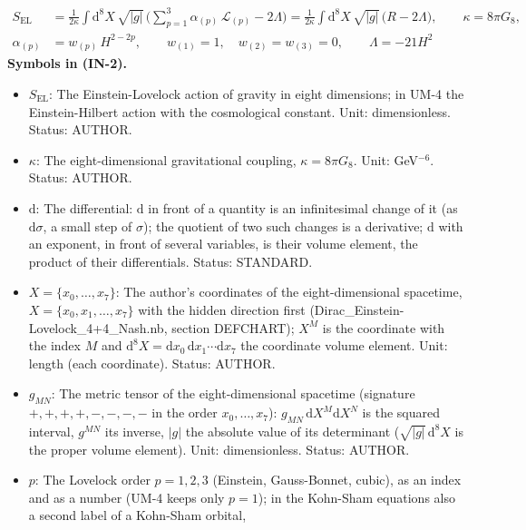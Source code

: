 \documentclass[
  10pt,
]{article}
\providecommand{\tightlist}{%
  \setlength{\itemsep}{0pt}\setlength{\parskip}{0pt}}
\begin{document}
\[
\begin{aligned}
S_{\mathrm{EL}} &= \frac{1}{2\kappa}\int\mathrm{d}^8X\,\sqrt{\lvert g\rvert}\,\Big(\sum_{p=1}^{3}\alpha_{(p)}\,\mathcal{L}_{(p)}
 - 2\Lambda\Big) = \frac{1}{2\kappa}\int\mathrm{d}^8X\,\sqrt{\lvert g\rvert}\,\big(R - 2\Lambda\big),\qquad \kappa = 8\pi G_8,\\
\alpha_{(p)} &= w_{(p)}\,H^{2-2p},\qquad w_{(1)} = 1,\quad w_{(2)} = w_{(3)} = 0,\qquad \Lambda = -21H^2
\end{aligned} \tag{IN-2}
\] \textbf{Symbols in (IN-2).}

\begin{itemize}
\tightlist
\item
  \(S_{\mathrm{EL}}\): The Einstein-Lovelock action of gravity in eight
  dimensions; in UM-4 the Einstein-Hilbert action with the cosmological
  constant. Unit: dimensionless. Status: AUTHOR.
\item
  \(\kappa\): The eight-dimensional gravitational coupling,
  \(\kappa = 8\pi G_8\). Unit: GeV\(^{-6}\). Status: AUTHOR.
\item
  \(\mathrm{d}\): The differential: \(\mathrm{d}\) in front of a
  quantity is an infinitesimal change of it (as \(\mathrm{d}\sigma\), a
  small step of \(\sigma\)); the quotient of two such changes is a
  derivative; \(\mathrm{d}\) with an exponent, in front of several
  variables, is their volume element, the product of their
  differentials. Status: STANDARD.
\item
  \(X = \{x_0, \dots, x_7\}\): The author's coordinates of the
  eight-dimensional spacetime, \(X = \{x_0, x_1, \dots, x_7\}\) with the
  hidden direction first (Dirac\_Einstein-Lovelock\_4+4\_Nash.nb,
  section DEFCHART); \(X^M\) is the coordinate with the index \(M\) and
  \(\mathrm{d}^8X = \mathrm{d}x_0\,\mathrm{d}x_1\cdots\mathrm{d}x_7\)
  the coordinate volume element. Unit: length (each coordinate). Status:
  AUTHOR.
\item
  \(g_{MN}\): The metric tensor of the eight-dimensional spacetime
  (signature \(+,+,+,+,-,-,-,-\) in the order \(x_0, \dots, x_7\)):
  \(g_{MN}\,\mathrm{d}X^M\mathrm{d}X^N\) is the squared interval,
  \(g^{MN}\) its inverse, \(\lvert g\rvert\) the absolute value of its
  determinant (\(\sqrt{\lvert g\rvert}\,\mathrm{d}^8X\) is the proper
  volume element). Unit: dimensionless. Status: AUTHOR.
\item
  \(p\): The Lovelock order \(p = 1, 2, 3\) (Einstein, Gauss-Bonnet,
  cubic), as an index and as a number (UM-4 keeps only \(p = 1\)); in
  the Kohn-Sham equations also a second label of a Kohn-Sham orbital,

\end{itemize}
\end{document}
